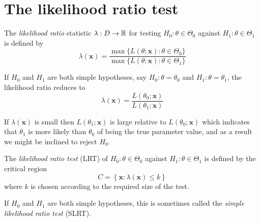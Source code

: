 
\section{The likelihood ratio test}\label{sec:slrt}

\begin{definition}
The \emph{likelihood ratio} statistic $\lambda:D\to\mathbb{R}$ for testing $H_0:\theta\in\Theta_0$ against $H_1:\theta\in\Theta_1$ is defined by
\[
\lambda(\mathbf{x}) = \frac{\max\{L(\theta;\mathbf{x}):\theta\in\Theta_0\}}{\max\{L(\theta;\mathbf{x}):\theta\in\Theta_1\}} 
\]
\end{definition}

If $H_0$ and $H_1$ are both simple hypotheses, say $H_0:\theta=\theta_0$ and $H_1:\theta=\theta_1$, the likelihood ratio reduces to
\[
\lambda(\mathbf{x}) = \frac{L(\theta_0;\mathbf{x})}{L(\theta_1;\mathbf{x})}
\]

If $\lambda(\mathbf{x})$ is small then $L(\theta_1;\mathbf{x})$ is large relative to $L(\theta_0;\mathbf{x})$ which indicates that $\theta_1$ is more likely than $\theta_0$ of being the true parameter value, and as a result we might be inclined to reject $H_0$. 

\begin{definition}
The \emph{likelihood ratio test} (LRT) of $H_0:\theta\in\Theta_0$ against $H_1:\theta\in\Theta_1$ is defined by the critical region
\[
C = \left\{\mathbf{x}:\lambda(\mathbf{x}) \leq k\right\}
\]
where $k$ is chosen according to the required size of the test.
\end{definition}

If $H_0$ and $H_1$ are both simple hypotheses, this is sometimes called the \emph{simple likelihood ratio test} (SLRT).

